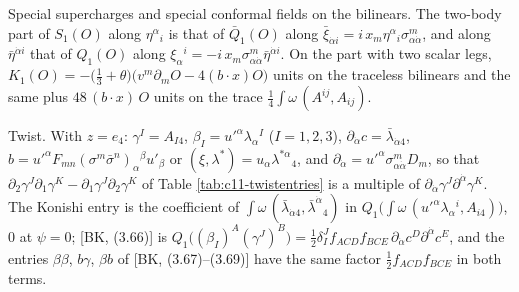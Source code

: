 \item Special supercharges and special conformal fields on the bilinears. The two-body part of $S_1(O)$ along $\eta^\alpha{}_i$ is that of $\bar Q_1(O)$ along $\bar\xi_{\dot\alpha i}=i\,x_m\eta^\alpha{}_i\sigma^m_{\alpha\dot\alpha}$, and along $\bar\eta^{\dot\alpha i}$ that of $Q_1(O)$ along $\xi_\alpha{}^i=-i\,x_m\sigma^m_{\alpha\dot\alpha}\bar\eta^{\dot\alpha i}$. On the part with two scalar legs, $K_1(O)=-\big(\tfrac13+\theta\big)\big(v^m\partial_mO-4(b\cdot x)O\big)$ units on the traceless bilinears and the same plus $48\,(b\cdot x)\,O$ units on the trace $\tfrac14\int\omega\,(A^{ij},A_{ij})$.
\item Twist. With $z=e_4$: $\gamma^I=A_{I4}$, $\beta_I=u'^\alpha\lambda_\alpha{}^I$ ($I=1,2,3$), $\partial_{\dot\alpha}c=\bar\lambda_{\dot\alpha4}$, $b=u'^\alpha F_{mn}(\sigma^m\bar\sigma^n)_\alpha{}^\beta u'_\beta$ or $(\xi,\lambda^*)=u_\alpha\lambda^{*\alpha}{}_4$, and $\partial_{\dot\alpha}=u'^\alpha\sigma^m_{\alpha\dot\alpha}D_m$, so that $\partial_2\gamma^J\partial_1\gamma^K-\partial_1\gamma^J\partial_2\gamma^K$ of Table \ref{tab:c11-twistentries} is a multiple of $\partial_{\dot\alpha}\gamma^J\partial^{\dot\alpha}\gamma^K$. The Konishi entry is the coefficient of $\int\omega\,(\bar\lambda_{\dot\alpha4},\bar\lambda^{\dot\alpha}{}_4)$ in $Q_1\big(\int\omega\,(u'^\alpha\lambda_\alpha{}^i,A_{i4})\big)$, $0$ at $\psi=0$; [BK, (3.66)] is $Q_1\big((\beta_I)^A(\gamma^J)^B\big)=\tfrac12\delta^J_If_{ACD}f_{BCE}\,\partial_{\dot\alpha}c^D\partial^{\dot\alpha}c^E$, and the entries $\beta\beta$, $b\gamma$, $\beta b$ of [BK, (3.67)--(3.69)] have the same factor $\tfrac12f_{ACD}f_{BCE}$ in both terms.

